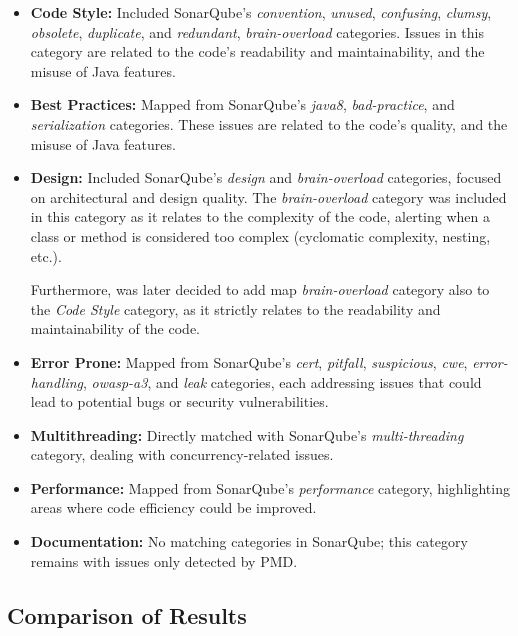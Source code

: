 \begin{itemize}
    \item \textbf{Code Style:} Included SonarQube's \textit{convention}, \textit{unused}, \textit{confusing}, \textit{clumsy}, \textit{obsolete}, \textit{duplicate}, and \textit{redundant}, \textit{brain-overload} categories. Issues in this category are related to the code's readability and maintainability, and the misuse of Java features.

    \item \textbf{Best Practices:} Mapped from SonarQube's \textit{java8}, \textit{bad-practice}, and \textit{serialization} categories. These issues are related to the code's quality, and the misuse of Java features.

    \item \textbf{Design:} Included SonarQube's \textit{design} and \textit{brain-overload} categories, focused on architectural and design quality. The \textit{brain-overload} category was included in this category as it relates to the complexity of the code, alerting when a class or method is considered too complex (cyclomatic complexity, nesting, etc.).

     Furthermore, was later decided to add map \textit{brain-overload} category also to the \textit{Code Style} category, as it strictly relates to the readability and maintainability of the code.

    \item \textbf{Error Prone:} Mapped from SonarQube's \textit{cert}, \textit{pitfall}, \textit{suspicious}, \textit{cwe}, \textit{error-handling}, \textit{owasp-a3}, and \textit{leak} categories, each addressing issues that could lead to potential bugs or security vulnerabilities.

    \item \textbf{Multithreading:} Directly matched with SonarQube's \textit{multi-threading} category, dealing with concurrency-related issues.

    \item \textbf{Performance:} Mapped from SonarQube's \textit{performance} category, highlighting areas where code efficiency could be improved.

    \item \textbf{Documentation:} No matching categories in SonarQube; this category remains with issues only detected by PMD.
\end{itemize}

\subsection{Comparison of Results}

